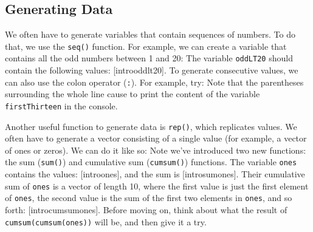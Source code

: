 \subsection{Generating Data}
We often have to generate variables that contain sequences of numbers. To do that,
we use the \lstinline{seq()} function. For example, we can create a variable that
contains all the odd numbers between 1 and 20:
The variable \lstinline{oddLT20} should contain the following values: 
[introoddlt20].
To generate consecutive values, we can also use the colon operator (\lstinline{:}). 
For example, try:
Note that the parentheses surrounding the whole line cause \R to print the content
of the variable \lstinline{firstThirteen} in the console.


Another useful function to generate data is \lstinline{rep()}, which replicates values.
We often have to generate a vector consisting of a single value (for example, 
a vector of ones or zeros). We can do it like so:
Note we've introduced two new functions: the sum (\lstinline{sum()}) and cumulative
sum (\lstinline{cumsum()}) functions.
The variable \lstinline{ones} contains the values: [introones],
and the sum is  [introsumones]. Their cumulative sum of
 \lstinline{ones} is  a vector of length 10, where the first value is just the first 
 element of \lstinline{ones}, the second value is the sum of the first two elements 
 in \lstinline{ones}, and so forth: [introcumsumones].
Before moving on, think about what the result of \lstinline{cumsum(cumsum(ones))}
will be, and then give it a try.


